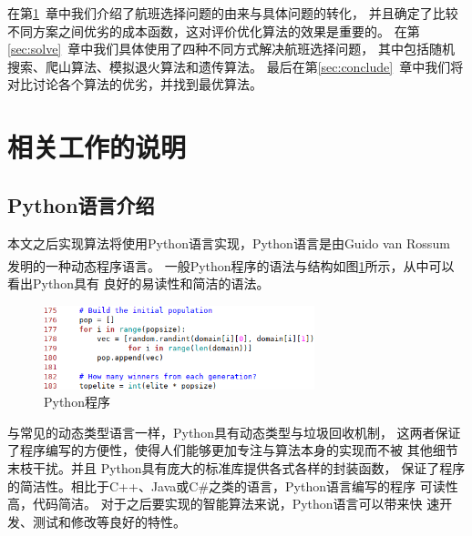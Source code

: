 \documentclass[fontset=fandol,a4paper,zihao=5]{ctexart}
\newcommand{\upcite}[1]{\textsuperscript{\textsuperscript{\cite{#1}}}}
\begin{document}
			在第\ref{sec:desc}\ 章中我们介绍了航班选择问题的由来与具体问题的转化，
      并且确定了比较不同方案之间优劣的成本函数，这对评价优化算法的效果是重要的。
      在第\ref{sec:solve}\ 章中我们具体使用了四种不同方式解决航班选择问题，
      其中包括随机搜索、爬山算法、模拟退火算法和遗传算法。
      最后在第\ref{sec:conclude}\ 章中我们将对比讨论各个算法的优劣，并找到最优算法。
	\section{相关工作的说明}
		\label{sec:desc}
		\subsection{Python语言介绍}
			本文之后实现算法将使用Python语言实现，Python语言是由Guido van Rossum
      发明的一种动态程序语言\upcite{Rossum1995Pythona}。
      一般Python程序的语法与结构如图\ref{fig:python_code}所示，从中可以看出Python具有
      良好的易读性和简洁的语法。
        \begin{figure}[!h]
            \centering
            \includegraphics[width=0.7\textwidth]{pic/python_code.png}
            \caption{\label{fig:python_code}Python程序}
        \end{figure}

			与常见的动态类型语言一样，Python具有动态类型与垃圾回收机制，
      这两者保证了程序编写的方便性，使得人们能够更加专注与算法本身的实现而不被
      其他细节末枝干扰。并且
      Python具有庞大的标准库提供各式各样的封装函数，
      保证了程序的简洁性。相比于C++、Java或C\#之类的语言，Python语言编写的程序
      可读性高，代码简洁。 对于之后要实现的智能算法来说，Python语言可以带来快
      速开发、测试和修改等良好的特性。
\end{document}
